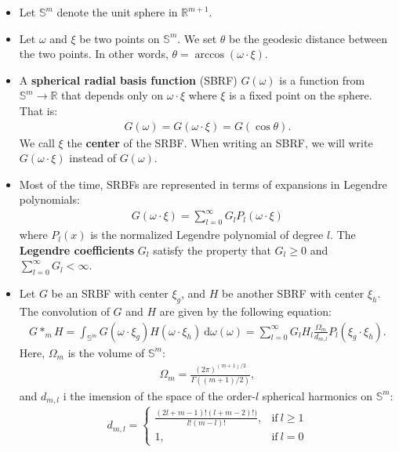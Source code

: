 \documentclass[10pt]{article}
\newcommand{\dee}{\mathrm{d}}
\begin{document}
  \begin{itemize}
    \item Let $\mathbb{S}^m$ denote the unit sphere in $\mathbb{R}^{m+1}$.
    
    \item Let $\omega$ and $\xi$ be two points on $\mathbb{S}^m$. We set $\theta$ be the geodesic distance between the two points. In other words, $\theta = \arccos(\omega \cdot \xi).$
      
    \item A \textbf{spherical radial basis function} (SBRF) $G(\omega)$ is a function from $\mathbb{S}^m \rightarrow \mathbb{R}$ that depends only on $\omega \cdot \xi$ where $\xi$ is a fixed point on the sphere. That is:
      \begin{align*}
        G(\omega) = G(\omega \cdot \xi) = G(\cos \theta).
      \end{align*}
    We call $\xi$ the \textbf{center} of the SRBF. When writing an SBRF, we will write $G(\omega \cdot \xi)$ instead of $G(\omega)$.
      
    \item Most of the time, SRBFs are represented in terms of expansions in Legendre polynomials:
      \begin{align*}
        G(\omega \cdot \xi) = \sum_{l=0}^\infty G_l P_l(\omega \cdot \xi)
      \end{align*}
      where $P_l(x)$ is the normalized Legendre polynomial of degree $l$. The \textbf{Legendre
      coefficients} $G_l$ satisfy the property that $G_l \geq 0$ and $\sum_{l=0}^\infty G_l < \infty$.          
    \item Let $G$ be an SRBF with center $\xi_g$, and $H$ be another SBRF with center $\xi_h$. The convolution of $G$ and $H$ are given by the following equation:
    \begin{align*}
      G *_m H 
      = \int_{\mathbb{S}^m} G(\omega \cdot \xi_g) H(\omega \cdot \xi_h)\ \dee \omega(\omega)
      = \sum_{l=0}^\infty G_l H_l \frac{\Omega_m}{d_{m,l}} P_l(\xi_g \cdot \xi_h).    
    \end{align*}
    Here, $\Omega_m$ is the volume of $\mathbb{S}^m$:
    \begin{align*}
      \Omega_m = \frac{(2\pi)^{(m+1)/2}}{\Gamma((m+1)/2)},      
    \end{align*}
    and $d_{m,l}$ i the imension of the space of the order-$l$ spherical harmonics on $\mathbb{S}^m$:
    \begin{align*}
      d_{m,l} = \begin{cases} 
        \frac{(2l+m-1)!(l+m-2)!)}{l!(m-l)!}, & \mathrm{if}\ l \geq 1 \\
        1, & \mathrm{if}\ l = 0
      \end{cases}
    \end{align*}
    

\end{itemize}
\end{document}
